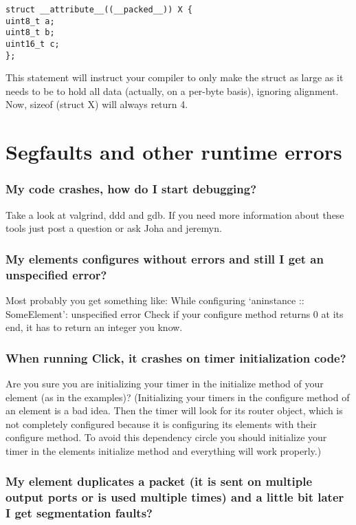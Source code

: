 \documentclass[a4paper]{article}
\begin{document}
\begin{lstlisting}
struct __attribute__((__packed__)) X {
uint8_t a;
uint8_t b;
uint16_t c;
};
\end{lstlisting}

This statement will instruct your compiler to only make the struct as large as it needs to be to hold all data (actually, on a per-byte basis), ignoring alignment. Now, sizeof (struct X) will always return 4.

\section{Segfaults and other runtime errors}

\subsubsection*{My code crashes, how do I start debugging?}

Take a look at valgrind, ddd and gdb. If you need more information about
these tools just post a question or ask Joha and jeremyn.

\subsubsection*{My elements configures without errors and still I get an unspecified
error?}

Most probably you get something like: While configuring `aninstance ::
SomeElement': unspecified error Check if your configure method returns 0
at its end, it has to return an integer you know.

\subsubsection*{When running Click, it crashes on timer initialization code?}

Are you sure you are initializing your timer in the initialize method of
your element (as in the examples)? (Initializing your timers in the
configure method of an element is a bad idea. Then the timer will look
for its router object, which is not completely configured because it is
configuring its elements with their configure method. To avoid this
dependency circle you should initialize your timer in the elements
initialize method and everything will work properly.)

\subsubsection*{My element duplicates a packet (it is sent on multiple output ports or
is used multiple times) and a little bit later I get segmentation
faults?}
\end{document}
